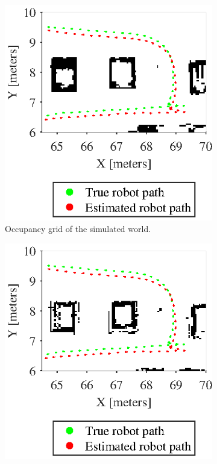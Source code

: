 \begin{figure}
	\centering
	\begin{subfigure}[t]{0.45\textwidth}
		\includegraphics[scale=1.0]{figures/static_mapping/map_region_with_poses}
		\caption{Occupancy grid of the simulated world.}
		\label{fig:map_region_with_poses}
	\end{subfigure}
	\begin{subfigure}[t]{0.45\textwidth}
		\includegraphics[scale=1.0]{figures/static_mapping/elfes_ideal_with_poses_no_decay}

\end{subfigure}
\end{figure}

